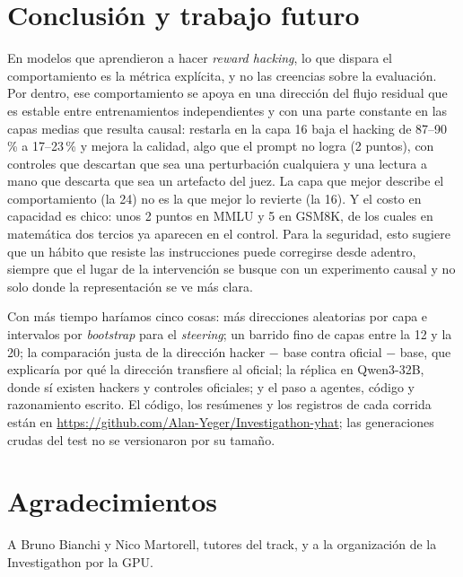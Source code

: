 \documentclass[conference,a4paper]{IEEEtran}
\begin{document}
\section{Conclusión y trabajo futuro}

En modelos que aprendieron a hacer \emph{reward hacking}, lo que dispara el
comportamiento es la métrica explícita, y no las creencias sobre la evaluación. Por
dentro, ese comportamiento se apoya en una dirección del flujo residual que es estable
entre entrenamientos independientes y con una parte constante en las capas medias que
resulta causal: restarla en la capa 16 baja el hacking de 87--90\,\% a 17--23\,\% y
mejora la calidad, algo que el prompt no logra (2 puntos), con controles que descartan
que sea una perturbación cualquiera y una lectura a mano que descarta que sea un
artefacto del juez. La capa que mejor describe el comportamiento (la 24) no es la que
mejor lo revierte (la 16). Y el costo en capacidad es chico: unos 2 puntos en MMLU y 5
en GSM8K, de los cuales en matemática dos tercios ya aparecen en el control. Para la
seguridad, esto sugiere que un hábito que resiste las instrucciones puede corregirse
desde adentro, siempre que el lugar de la intervención se busque con un experimento
causal y no solo donde la representación se ve más clara.

Con más tiempo haríamos cinco cosas: más direcciones aleatorias por capa e intervalos
por \emph{bootstrap} para el \emph{steering}; un barrido fino de capas entre la 12 y la
20; la comparación justa de la dirección hacker $-$ base contra oficial $-$ base,
que explicaría por qué la dirección transfiere al oficial; la réplica en Qwen3-32B,
donde sí existen hackers y controles oficiales; y el paso a agentes, código y
razonamiento escrito. El código, los resúmenes y los registros de cada corrida están en
\url{https://github.com/Alan-Yeger/Investigathon-yhat}; las generaciones crudas del test
no se versionaron por su tamaño.

\section*{Agradecimientos}
A Bruno Bianchi y Nico Martorell, tutores del track, y a la organización de la
Investigathon por la GPU.
\end{document}
